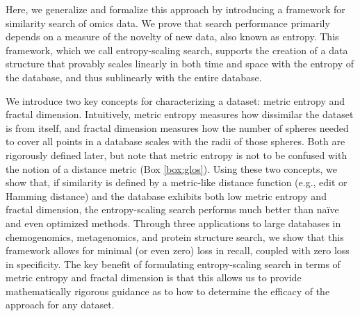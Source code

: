 \documentclass[review,preprint,12pt]{elsarticle}
\theoremstyle{definition}
\theoremstyle{remark}
\numberwithin{equation}{section}
\begin{document}
Here, we generalize and formalize this approach by introducing 
a framework for similarity search of omics data.
We prove that search performance primarily depends on a measure of the novelty of new data, also known as entropy.
This framework, which we call entropy-scaling search, supports the creation of a data structure that provably scales linearly in both time and space with the entropy of the database, and thus sublinearly with the entire database.

We introduce two key concepts for characterizing a dataset: metric entropy and fractal dimension.
Intuitively, metric entropy measures how dissimilar the dataset is from itself, and fractal dimension measures how the number of spheres needed to cover all points in a database scales with the radii of those spheres.
Both are rigorously defined later, but note that metric entropy is not to be confused with the notion of a distance metric (Box \ref{box:glos}).
Using these two concepts, we show that, if similarity is defined by a metric-like distance function (e.g., edit or Hamming distance) and the database exhibits both low metric entropy and fractal dimension, the entropy-scaling search performs much better than naïve and even optimized methods.
Through three applications to large databases in chemogenomics, metagenomics, and protein structure search, we show that this framework allows for minimal (or even zero) loss in recall, coupled with zero loss in specificity.
The key benefit of formulating entropy-scaling search in terms of metric entropy and fractal dimension is that this allows us to provide mathematically rigorous guidance as to how to determine the efficacy of the approach for any dataset.
\end{document}
